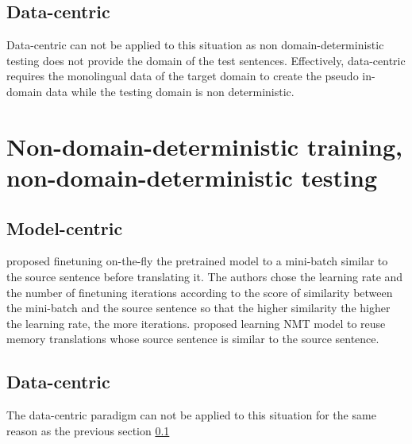 \subsection{Data-centric} \label{ssec:data-centric}
Data-centric can not be applied to this situation as non domain-deterministic testing does not provide the domain of the test sentences. Effectively, data-centric requires the monolingual data of the target domain to create the pseudo in-domain data while the testing domain is non deterministic.
\section{Non-domain-deterministic training, non-domain-deterministic testing}
\label{sec:case4}
\subsection{Model-centric}
\citet{Li18onesentence, Farajian17multidomain} proposed finetuning on-the-fly the pretrained model to a mini-batch similar to the source sentence before translating it. The authors chose the learning rate and the number of finetuning iterations according to the score of similarity between the mini-batch and the source sentence so that the higher similarity the higher the learning rate, the more iterations. \citet{Pham20Priming,xu20boosting,bulte19neural,bapna19non} proposed learning NMT model to reuse memory translations whose source sentence is similar to the source sentence. 
\subsection{Data-centric}
The data-centric paradigm can not be applied to this situation for the same reason as the previous section \ref{ssec:data-centric}

